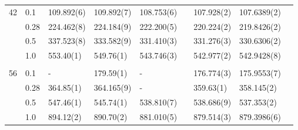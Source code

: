 {\begin{landscape}
\begin{table}
\begin{tabularx}{\hsize}{llR{2.65cm}R{2.65cm}R{2.65cm}R{2.65cm}R{2.65cm}R{2.65cm}R{2.65cm}}
		42 & 0.1 & 109.892(6) & 109.892(7) & 108.753(6) & &  107.928(2) & 107.6389(2) \\ 
		& 0.28 & 224.462(8) & 224.184(9) & 222.200(5) & & 220.224(2) & 219.8426(2) \\
		& 0.5 & 337.523(8) & 333.582(9) & 331.410(3) & & 331.276(3) & 330.6306(2) \\
		& 1.0 & 553.40(1) & 549.76(1) & 543.746(3) & & 542.977(2) & 542.9428(8) \\ \hdashline \\
		
		56 & 0.1 & - & 179.59(1) & - & & 176.774(3) & 175.9553(7) \\ 
		& 0.28 & 364.85(1) & 364.165(9) & - & & 359.63(1) & 358.145(2) \\
		& 0.5 & 547.46(1) & 545.74(1) & 538.810(7) & & 538.686(9) & 537.353(2) \\
		& 1.0 & 894.12(2) & 890.70(2) & 881.010(5) & & 879.514(3) & 879.3986(6) \\ \hline\hline
	\end{tabularx}
\end{table}


\end{landscape}}
